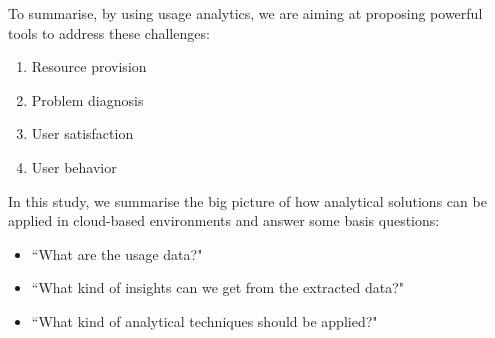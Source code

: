 To summarise, by using usage analytics, we are aiming at proposing powerful tools to address these challenges: 
\begin{enumerate}
\item Resource provision
\item Problem diagnosis
\item User satisfaction
\item User behavior
\end{enumerate}

In this study, we summarise the big picture of how analytical solutions can be applied in cloud-based environments and answer some basis questions: 
\begin{itemize}
	\item ``What are the usage data?"
	\item ``What kind of insights can we get from the extracted data?"
	\item ``What kind of analytical techniques should be applied?"
\end{itemize}